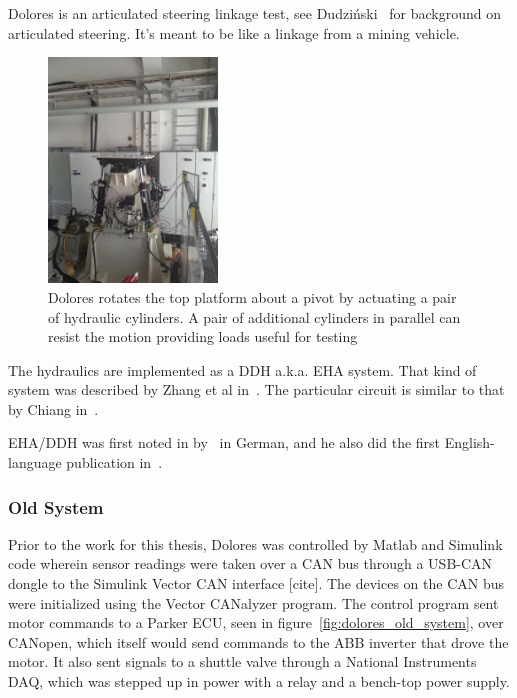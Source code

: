 \documentclass[english,12pt,a4paper,pdftex,eng,utf8]{aaltothesis}
\begin{document}
Dolores is an articulated steering linkage test, see Dudziński~\cite{Dudzinski1989} for background on articulated steering.  It's meant to be like a linkage from a mining vehicle.

\begin{figure}[h]
	\centering
	\includegraphics[width=0.4\textwidth]{assets/dolores}
	\caption{Dolores rotates the top platform about a pivot by actuating a pair of hydraulic cylinders.  A pair of additional cylinders in parallel can resist the motion providing loads useful for testing}\label{fig:dolores}
\end{figure}

The hydraulics are implemented as a DDH a.k.a. EHA system.  That kind of system was described by Zhang et al in~\cite{Zhang2017}.  The particular circuit is similar to that by Chiang in~\cite{Chiang2011}.

EHA/DDH was first noted in by~\cite{Helduser1995} in German, and he also did the first English-language publication in~\cite{Helduser1999}.

\subsubsection{Old System}

Prior to the work for this thesis, Dolores was controlled by Matlab and Simulink code wherein sensor readings were taken over a CAN bus through a USB-CAN dongle to the Simulink Vector CAN interface [cite].  The devices on the CAN bus were initialized using the Vector CANalyzer program.  The control program sent motor commands to a Parker ECU, seen in figure~\ref{fig:dolores_old_system}, over CANopen, which itself would send commands to the ABB inverter that drove the motor.  It also sent signals to a shuttle valve through a National Instruments DAQ, which was stepped up in power with a relay and a bench-top power supply.
\end{document}
